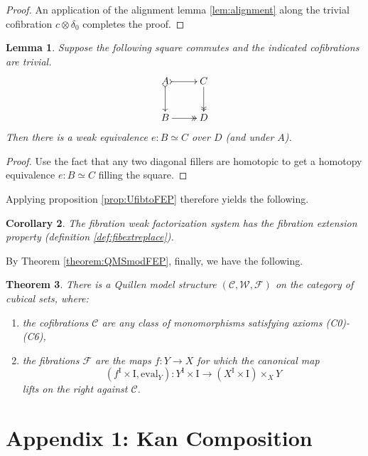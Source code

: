 \documentclass[12pt]{article}
\newcommand{\CC}{\ensuremath{\mathcal{C}}}
\newcommand{\WW}{\ensuremath{\mathcal{W}}}
\newcommand{\FF}{\ensuremath{\mathcal{F}}}
\newcommand{\ra}{\ensuremath{\rightarrow}}
\newcommand{\I}{\ensuremath{\mathrm{I}}}
\newtheorem{theorem}{Theorem}
\newtheorem{lemma}[theorem]{Lemma}
\newtheorem{corollary}[theorem]{Corollary}
\theoremstyle{remark}
\theoremstyle{definition}
\begin{document}
\begin{proof}
An application of the alignment lemma \ref{lem:alignment} along the trivial cofibration $c\otimes \delta_0$ completes the proof.
\end{proof}

\begin{lemma}\label{lem:simple}
Suppose the following square commutes and the indicated cofibrations are trivial.
\begin{equation}\label{diag:standard1}
\xymatrix{
A \ar@{>->}[d] \ar@{>->}[r] & C \ar@{>>}[d] \\
B  \ar@{>>}[r] &  D \\
}
\end{equation}
Then there is a weak equivalence $e : B \simeq C$ over $D$ (and under $A$).
\end{lemma}
\begin{proof}
Use the fact that any two diagonal fillers are homotopic to get a homotopy equivalence $e : B \simeq C$ filling the square.
\end{proof}

Applying proposition \ref{prop:UfibtoFEP} therefore yields the following.

\begin{corollary}
The fibration weak factorization system has the fibration extension property (definition \ref{def:fibextreplace}). 
\end{corollary}

By Theorem \ref{theorem:QMSmodFEP}, finally, we have the following.

\begin{theorem}\label{theorem:QMS}
There is a Quillen model structure $(\CC,\WW,\FF)$ on the category of cubical sets, where:
\begin{enumerate}
\item the cofibrations $\CC$ are any class of monomorphisms satisfying axioms (C0)-(C6),
\item the fibrations $\FF$ are the maps $f : Y\ra X$ for which the canonical map 
\[
(f^\I \times \I, \mathrm{eval}_Y) : Y^\I \times \I\ra (X^\I \times \I)\times_X Y
\]
lifts on the right against $\CC$.
\end{enumerate}
\end{theorem}

%


%


\section*{Appendix 1: Kan Composition}\label{appendix:KanComp}
\end{document}
